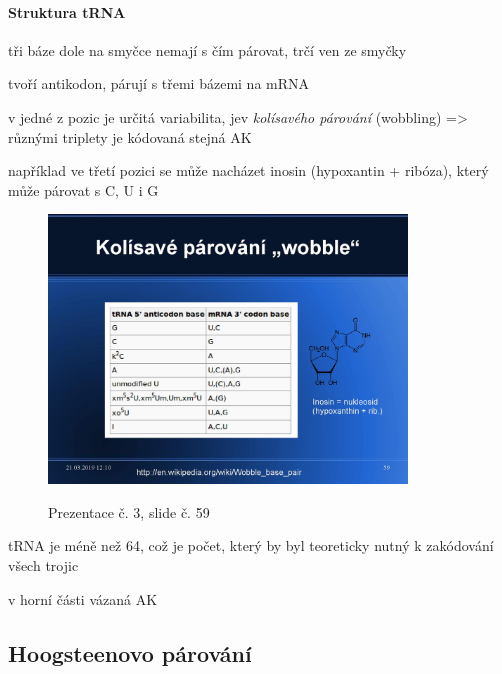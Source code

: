 \documentclass[DIV=8]{scrreprt}
\begin{document}
\paragraph{Struktura tRNA}
\begin{myItemize}[nosep]
    \item tři báze dole na smyčce nemají s čím párovat, trčí ven ze smyčky
\begin{myItemize}[nosep]
    \item tvoří antikodon, párují s třemi bázemi na mRNA
    \item v jedné z pozic je určitá variabilita, jev \emph{kolísavého párování} (wobbling) => různými triplety je kódovaná stejná AK
\begin{myItemize}[nosep]
    \item například ve třetí pozici se může nacházet inosin (hypoxantin + ribóza), který může párovat s C, U i G \begin{figure}
    \caption{Prezentace č. 3, slide č. 59}
    \includegraphics[width=0.85\textwidth]{slides-3/slide-59.jpg}
    \centering
    \label{slides-3-slide-59}
\end{figure}

    \item tRNA je méně než 64, což je počet, který by byl teoreticky nutný k zakódování všech trojic
\end{myItemize}

\end{myItemize}

    \item v horní části vázaná AK
\end{myItemize}



\subsection{Hoogsteenovo párování} \label{Hoogsteenovo párování}
\end{document}
